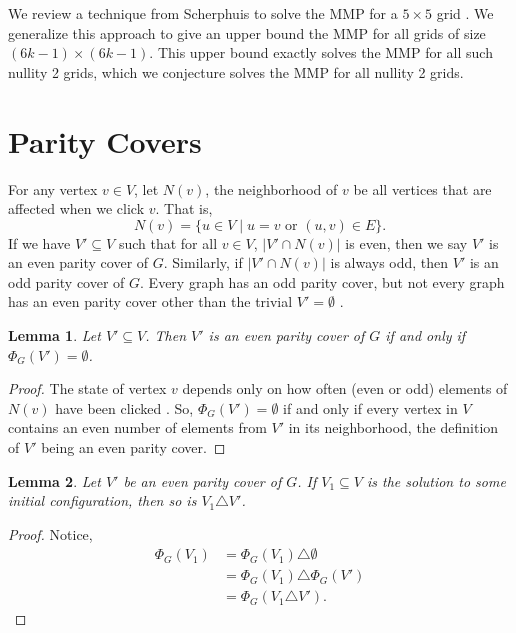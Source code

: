 \documentclass[a4paper]{article}
\newtheorem{lemma}{Lemma}
\newcommand{\abs}[1]{\left| #1 \right|}
\begin{document}
	We review a technique from Scherphuis to solve the MMP for a $5 \times 5$ grid \cite{jaap}.
	We generalize this approach to give an upper bound the MMP for all grids of size $(6k-1) \times (6k-1)$.
	This upper bound exactly solves the MMP for all such nullity 2 grids, which we conjecture solves the MMP for all nullity 2 grids.
	
	\section{Parity Covers}
	For any vertex $v \in V$, let $N(v)$, the neighborhood of $v$ be all vertices that are affected when we click $v$.
	That is,
	\begin{equation*}
		N(v) = \{u \in V \mid u=v \text{ or } (u,v) \in E\}.
	\end{equation*}
	If we have $V' \subseteq V$ such that for all $v \in V$, $\abs{V' \cap N(v)}$ is even, then we say $V'$ is an even parity cover of $G$.
	Similarly, if $\abs{V' \cap N(v)}$ is always odd, then $V'$ is an odd parity cover of $G$.
	Every graph has an odd parity cover, but not every graph has an even parity cover other than the trivial $V' = \emptyset$ \cite{Sutner1989}.
	
	\begin{lemma}\label{empty-is-even}
		Let $V' \subseteq V$.
		Then $V'$ is an even parity cover of $G$ if and only if $\Phi_G(V') = \emptyset$.
	\end{lemma}
	\begin{proof}
		The state of vertex $v$ depends only on how often (even or odd) elements of $N(v)$ have been clicked \cite{Sutner1989}.
		So, $\Phi_G(V') = \emptyset$ if and only if every vertex in $V$ contains an even number of elements from $V'$ in its neighborhood, the definition of $V'$ being an even parity cover.
	\end{proof}
	
	\begin{lemma}
		Let $V'$ be an even parity cover of $G$.
		If $V_1 \subseteq V$ is the solution to some initial configuration, then so is $V_1 \triangle V'$.
	\end{lemma}
	\begin{proof}
		Notice,
		\begin{align*}
			\Phi_G(V_1) &= \Phi_G(V_1) \triangle \emptyset \\
			&= \Phi_G(V_1) \triangle \Phi_G(V') \\
			&= \Phi_G(V_1 \triangle V').
		\end{align*}
	\end{proof}
\end{document}

